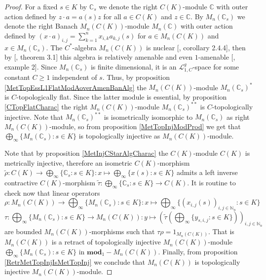 \begin{proof} For a fixed $s\in K$ by $\mathbb{C}_s$ we denote the right $C(K)$-module $\mathbb{C}$ with outer action defined by $z\cdot a=a(s)z$ for all $a\in C(K)$ and $z\in\mathbb{C}$. By $M_n(\mathbb{C}_s)$ we denote the right Banach $M_n(C(K))$-module $M_n(\mathbb{C})$ with outer action defined by $(x\cdot a)_{i,j}=\sum_{k=1}^n x_{i,k}a_{k,j}(s)$ for $a\in M_n(C(K))$ and $x\in M_n(\mathbb{C}_s)$. The $C^*$-algebra $M_n(C(K))$ is nuclear [\cite{BroOzaCStarAlgFinDimApprox}, corollary 2.4.4], then by [\cite{HaaNucCStarAlgAmen}, theorem 3.1] this algebra is relatively amenable and even $1$-amenable [\cite{RundeAmenConstFour}, example 2]. Since $M_n(\mathbb{C}_s)$ is finite dimensional, it is an $\mathscr{L}_{1, C}^g$-space for some constant $C\geq 1$ independent of $s$. Thus, by proposition \ref{MetTopEssL1FlatModAoverAmenBanAlg} the $M_n(C(K))$-module $M_n(\mathbb{C}_s)^*$ is $C$-topologically flat. Since the latter module is essential, by proposition \ref{CTopFlatCharac} the right $M_n(C(K))$-module $M_n(\mathbb{C}_s)^{**}$ is $C$-topologically injective. Note that $M_n(\mathbb{C}_s)^{**}$ is isometrically isomorphic to $M_n(\mathbb{C}_s)$ as right $M_n(C(K))$-module, so from proposition \ref{MetTopInjModProd} we get that $\bigoplus_\infty\{M_n(\mathbb{C}_s):s\in K\}$ is topologically injective as $M_n(C(K))$-module.

Note that by proposition \ref{MetInjCStarAlgCharac} the $C(K)$-module $C(K)$ is metrically injective, therefore an isometric $C(K)$-morphism $\widetilde{\rho}:C(K)\to\bigoplus_\infty\{ \mathbb{C}_s:s\in K\}:x\mapsto \bigoplus_\infty\{x(s):s\in K\}$ admits a left inverse contractive $C(K)$-morphism $\widetilde{\tau}:\bigoplus_\infty\{ \mathbb{C}_s:s\in K\} \to C(K)$. It is routine to check now that linear operators
$$
\rho:M_n(C(K))\to\bigoplus\nolimits_\infty\{M_n(\mathbb{C}_s):s\in K\}:x\mapsto \bigoplus\nolimits_\infty\{(x_{i,j}(s))_{i,j\in\mathbb{N}_n}:s\in K\}
$$
$$
\tau:\bigoplus\nolimits_\infty\{M_n(\mathbb{C}_s):s\in K\}\to M_n(C(K)):y\mapsto \left(\widetilde{\tau}\left(\bigoplus\nolimits_\infty\{y_{s,i,j}:s\in K\}\right)\right)_{i,j\in\mathbb{N}_n}
$$
are bounded $M_n(C(K))$-morphisms such that $\tau \rho=1_{M_n(C(K))}$. That is $M_n(C(K))$ is a retract of topologically injective $M_n(C(K))$-module $\bigoplus_\infty\{M_n(\mathbb{C}_s):s\in K\}$ in $\mathbf{mod}_1-M_n(C(K))$. Finally, from proposition \ref{RetrMetTopInjIsMetTopInj} we conclude that $M_n(C(K))$ is topologically injective $M_n(C(K))$-module.
\end{proof}


